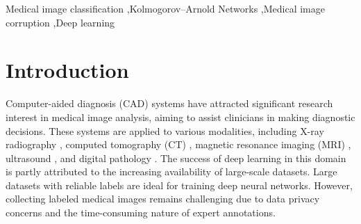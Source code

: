 \documentclass[times,twocolumn,final]{elsarticle}
\begin{document}
\begin{frontmatter}
\begin{abstract}


\end{abstract}

\begin{keyword}
Medical image classification \sep Kolmogorov–Arnold Networks  \sep Medical image corruption \sep Deep learning
\end{keyword}
\end{frontmatter}


\section{Introduction}
%
Computer-aided diagnosis (CAD) systems have attracted significant research interest in medical image analysis, aiming to assist clinicians in making diagnostic decisions. These systems are applied to various modalities, including X-ray radiography \cite{dai2024unichest}, computed tomography (CT) \cite{lee2025low}, magnetic resonance imaging (MRI) \cite{loizillon2024automatic}, ultrasound \cite{yang2024hierarchical}, and digital pathology \cite{wang2024breast}. The success of deep learning in this domain is partly attributed to the increasing availability of large-scale datasets.  Large datasets with reliable labels are ideal for training deep neural networks.
However, collecting labeled medical images remains challenging due to data privacy concerns and the time-consuming nature of expert annotations. %

\end{document}
